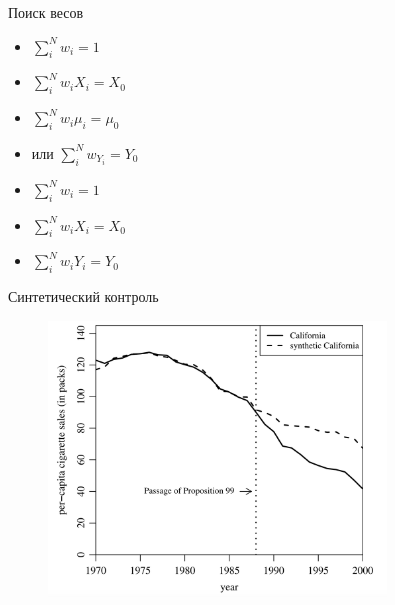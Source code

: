 \begin{frame}{Поиск весов}
    \begin{itemize}
        \item $\sum^N_iw_i = 1$
        \item $\sum^N_iw_iX_i = X_0$
        \item $\sum^N_iw_i\mu_i = \mu_0$
        \pause
        \item<+-> или $\sum^N_iw_Y_i = Y_0$
    \end{itemize}
    \pause
    \begin{itemize}
        \item $\sum^N_iw_i = 1$
        \item $\sum^N_iw_iX_i = X_0$
        \item $\sum^N_iw_iY_i = Y_0$
    \end{itemize}
    
    \pause
\end{frame}


\begin{frame}{Синтетический контроль}
\begin{figure}
    \centering
    \includegraphics[width=0.8\textwidth]{Images/california_synth.png}
\end{figure}
\end{frame}

